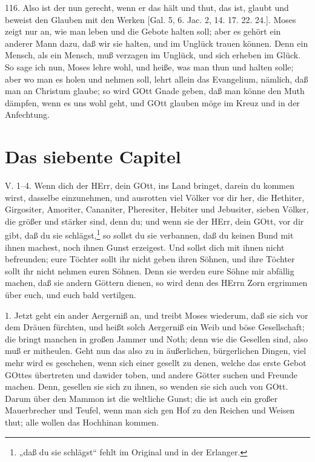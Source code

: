 116. Also ist der nun gerecht, wenn er das hält und thut, das ist, glaubt und beweist den Glauben mit den Werken [Gal. 5, 6. Jac. 2, 14. 17. 22. 24.]. Moses zeigt nur an, wie man leben und die Gebote halten soll; aber es gehört ein anderer Mann dazu, daß wir sie halten, und im Unglück trauen können. Denn ein Mensch, als ein Mensch, muß verzagen im Unglück, und sich erheben im Glück. So sage ich nun, Moses lehre wohl, und heiße, was man thun und halten solle; aber wo man es holen und nehmen soll, lehrt allein das Evangelium, nämlich, daß man an Christum glaube; so wird GOtt Gnade geben, daß man könne den Muth dämpfen, wenn es uns wohl geht, und GOtt glauben möge im Kreuz und in der Anfechtung.

\section{Das siebente Capitel}

\begin{schriftzitat}
V. 1–4. Wenn dich der HErr, dein GOtt, ins Land bringet, darein du kommen wirst, dasselbe einzunehmen, und ausrotten viel Völker vor dir her, die Hethiter, Girgositer, Amoriter, Cananiter, Pheresiter, Hebiter und Jebusiter, sieben Völker, die größer und stärker sind, denn du; und wenn sie der HErr, dein GOtt, vor dir gibt, daß du sie schlägst,\footnote{„daß du sie schlägst“ fehlt im Original und in der Erlanger.} so sollst du sie verbannen, daß du keinen Bund mit ihnen machest, noch ihnen Gunst erzeigest. Und sollst dich mit ihnen nicht befreunden; eure Töchter sollt ihr nicht geben ihren Söhnen, und ihre Töchter sollt ihr nicht nehmen euren Söhnen. Denn sie werden eure Söhne mir abfällig machen, daß sie andern Göttern dienen, so wird denn des HErrn Zorn ergrimmen über euch, und euch bald vertilgen.
\end{schriftzitat}

1. Jetzt geht ein ander Aergerniß an, und treibt Moses wiederum, daß sie sich vor dem Dräuen fürchten, und heißt solch Aergerniß ein Weib und böse Gesellschaft; die bringt manchen in großen Jammer und Noth; denn wie die Gesellen sind, also muß er mitheulen. Geht nun das also zu in äußerlichen, bürgerlichen Dingen, viel mehr wird es geschehen, wenn sich einer gesellt zu denen, welche das erste Gebot GOttes übertreten und dawider toben, und andere Götter suchen und Freunde machen. Denn, gesellen sie sich zu ihnen, so wenden sie sich auch von GOtt. Darum über den Mammon ist die weltliche Gunst; die ist auch ein großer Mauerbrecher und Teufel, wenn man sich gen Hof zu den Reichen und Weisen thut; alle wollen das Hochhinan kommen.

